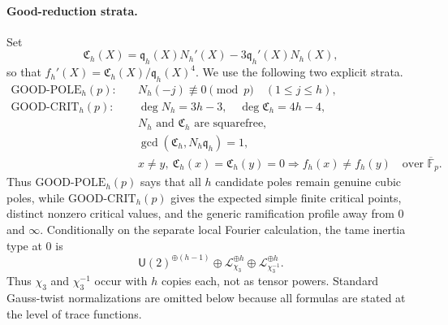 \paragraph{Good-reduction strata.}
Set
\[
 \mathfrak C_h(X)
 =\mathfrak q_h(X)N_h'(X)-3\mathfrak q_h'(X)N_h(X),
\]
so that $f_h'(X)=\mathfrak C_h(X)/\mathfrak q_h(X)^4$.
We use the following two explicit strata.
\begin{align*}
 \mathrm{GOOD\mbox{-}POLE}_h(p):\quad
 &N_h(-j)\not\equiv0\pmod p
 \quad(1\le j\le h),\\
 \mathrm{GOOD\mbox{-}CRIT}_h(p):\quad
 &\deg N_h=3h-3,
 \quad \deg\mathfrak C_h=4h-4,\\
 &N_h\text{ and }\mathfrak C_h\text{ are squarefree},\\
 &\gcd(\mathfrak C_h,N_h\mathfrak q_h)=1,\\
 &x\ne y,\ \mathfrak C_h(x)=\mathfrak C_h(y)=0
 \Longrightarrow f_h(x)\ne f_h(y)
 \quad\text{over }\overline{\mathbb F}_p.
\end{align*}
Thus $\mathrm{GOOD\mbox{-}POLE}_h(p)$ says that all $h$ candidate
poles remain genuine cubic poles, while
$\mathrm{GOOD\mbox{-}CRIT}_h(p)$ gives the expected simple finite
critical points, distinct nonzero critical values, and the generic
ramification profile away from $0$ and $\infty$.
Conditionally on the separate local Fourier calculation, the tame
inertia type at $0$ is
\[
 \mathsf U(2)^{\oplus(h-1)}
 \oplus \mathcal L_{\chi_3}^{\oplus h}
 \oplus \mathcal L_{\chi_3^{-1}}^{\oplus h}.
\]
Thus $\chi_3$ and $\chi_3^{-1}$ occur with $h$ copies each, not as
tensor powers.  Standard Gauss-twist normalizations are omitted below
because all formulas are stated at the level of trace functions.

